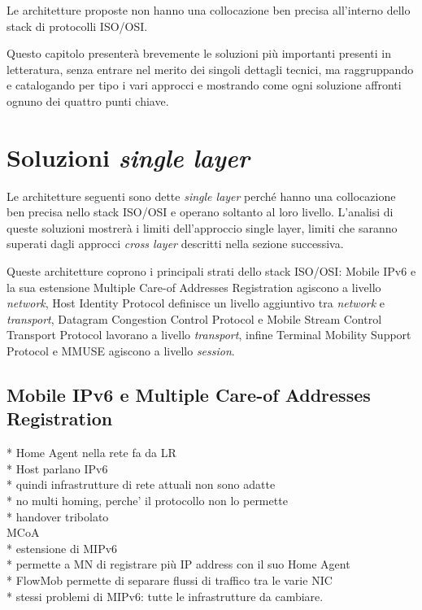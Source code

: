 \documentclass[12pt,a4paper,openright,twoside]{book}
\begin{document}
Le architetture proposte non hanno una collocazione ben precisa
all'interno dello stack di protocolli ISO/OSI.

Questo capitolo presenterà brevemente le soluzioni più importanti
presenti in letteratura, senza entrare nel merito dei singoli dettagli
tecnici, ma raggruppando e catalogando per tipo i vari approcci e
mostrando come ogni soluzione affronti ognuno dei quattro punti
chiave.

\section{Soluzioni \emph{single layer}}
Le architetture seguenti sono dette \emph{single layer} perché hanno
una collocazione ben precisa nello stack ISO/OSI e operano soltanto al
loro livello. L'analisi di queste soluzioni mostrerà i limiti
dell'approccio single layer, limiti che saranno superati dagli
approcci \emph{cross layer} descritti nella sezione successiva.

Queste architetture coprono i principali strati dello stack ISO/OSI:
Mobile IPv6 \cite{bib:mipv6} e la sua estensione Multiple Care-of
Addresses Registration \cite{bib:mcoa} agiscono a livello
\emph{network}, Host Identity Protocol \cite{bib:hip} definisce un
livello aggiuntivo tra \emph{network} e \emph{transport}, Datagram
Congestion Control Protocol \cite{bib:dccp} e Mobile Stream Control
Transport Protocol \cite{bib:m-sctp} lavorano a livello
\emph{transport}, infine Terminal Mobility Support Protocol
\cite{bib:tmsp} e MMUSE \cite{bib:mmuse} agiscono a livello
\emph{session}.

\subsection{Mobile IPv6 e Multiple Care-of Addresses Registration}
* Home Agent nella rete fa da LR\\
* Host parlano IPv6\\
* quindi infrastrutture di rete attuali non sono adatte\\
* no multi homing, perche' il protocollo non lo permette\\
* handover tribolato\\
MCoA\\
* estensione di MIPv6\\
* permette a MN di registrare più IP address con il suo Home Agent\\
* FlowMob permette di separare flussi di traffico tra le varie NIC\\
* stessi problemi di MIPv6: tutte le infrastrutture da cambiare.
\end{document}
